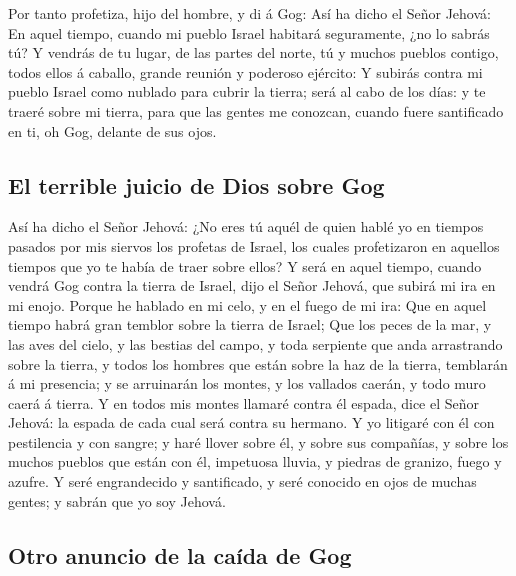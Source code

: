  Por tanto profetiza, hijo del hombre, y di á Gog: Así ha
dicho el Señor Jehová: En aquel tiempo, cuando mi pueblo Israel habitará
seguramente, ¿no lo sabrás tú?  Y vendrás de tu lugar, de
las partes del norte, tú y muchos pueblos contigo, todos ellos á
caballo, grande reunión y poderoso ejército:  Y subirás
contra mi pueblo Israel como nublado para cubrir la tierra; será al cabo
de los días: y te traeré sobre mi tierra, para que las gentes me
conozcan, cuando fuere santificado en ti, oh Gog, delante de sus ojos.

\hypertarget{el-terrible-juicio-de-dios-sobre-gog}{%
\subsection{El terrible juicio de Dios sobre
Gog}\label{el-terrible-juicio-de-dios-sobre-gog}}

 Así ha dicho el Señor Jehová: ¿No eres tú aquél de quien
hablé yo en tiempos pasados por mis siervos los profetas de Israel, los
cuales profetizaron en aquellos tiempos que yo te había de traer sobre
ellos?  Y será en aquel tiempo, cuando vendrá Gog contra
la tierra de Israel, dijo el Señor Jehová, que subirá mi ira en mi
enojo.  Porque he hablado en mi celo, y en el fuego de mi
ira: Que en aquel tiempo habrá gran temblor sobre la tierra de Israel;
 Que los peces de la mar, y las aves del cielo, y las
bestias del campo, y toda serpiente que anda arrastrando sobre la
tierra, y todos los hombres que están sobre la haz de la tierra,
temblarán á mi presencia; y se arruinarán los montes, y los vallados
caerán, y todo muro caerá á tierra.  Y en todos mis
montes llamaré contra él espada, dice el Señor Jehová: la espada de cada
cual será contra su hermano.  Y yo litigaré con él con
pestilencia y con sangre; y haré llover sobre él, y sobre sus compañías,
y sobre los muchos pueblos que están con él, impetuosa lluvia, y piedras
de granizo, fuego y azufre.  Y seré engrandecido y
santificado, y seré conocido en ojos de muchas gentes; y sabrán que yo
soy Jehová.

\hypertarget{otro-anuncio-de-la-cauxedda-de-gog}{%
\subsection{Otro anuncio de la caída de
Gog}\label{otro-anuncio-de-la-cauxedda-de-gog}}

